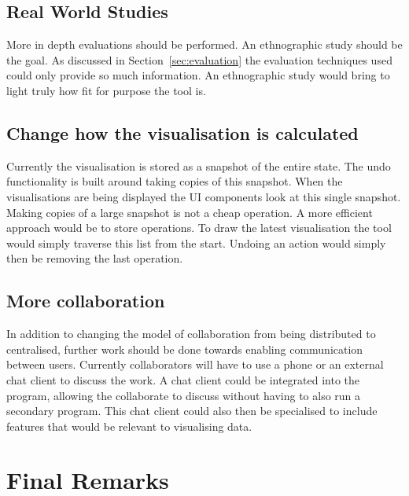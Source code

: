 \subsection{Real World Studies}
More in depth evaluations should be performed.  An ethnographic study should be the goal.  As discussed in Section~\ref{sec:evaluation} the evaluation techniques used could only provide so much information.  An ethnographic study would bring to light truly how fit for purpose the tool is.

\subsection{Change how the visualisation is calculated}
Currently the visualisation is stored as a snapshot of the entire state.  The undo functionality is built around taking copies of this snapshot. When the visualisations are being displayed the \ac{UI} components look at this single snapshot.  Making copies of a large snapshot is not a cheap operation.  A more efficient approach would be to store operations.  To draw the latest visualisation the tool would simply traverse this list from the start.  Undoing an action would simply then be removing the last operation.

\subsection{More collaboration}
In addition to changing the model of collaboration from being distributed to centralised, further work should be done towards enabling communication between users.  Currently collaborators will have to use a phone or an external chat client to discuss the work.  A chat client could be integrated into the program, allowing the collaborate to discuss without having to also run a secondary program.  This chat client could also then be specialised to include features that would be relevant to visualising data.

\section{Final Remarks}


